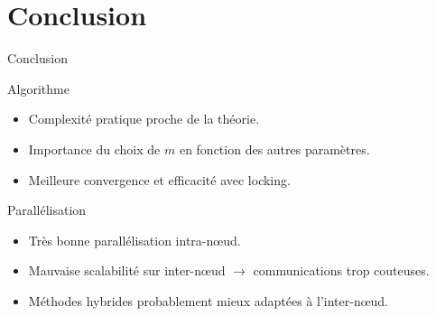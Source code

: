 \documentclass[9.5pt]{beamer}
\begin{document}
\section{Conclusion}
	\begin{frame}{Conclusion}
		\begin{block}{Algorithme}
			\begin{itemize}
				\item Complexité pratique proche de la théorie.
				\item Importance du choix de $m$ en fonction des autres paramètres.
				\item Meilleure convergence et efficacité avec locking.
			\end{itemize}
		\end{block}

		\begin{block}{Parallélisation}
			\begin{itemize}
				\item Très bonne parallélisation intra-n\oe{}ud.
				\item Mauvaise scalabilité sur inter-n\oe{}ud $\rightarrow$ communications trop couteuses.
				\item Méthodes hybrides probablement mieux adaptées à l'inter-n\oe{}ud.
			\end{itemize}
		\end{block}
	\end{frame}
\end{document}
